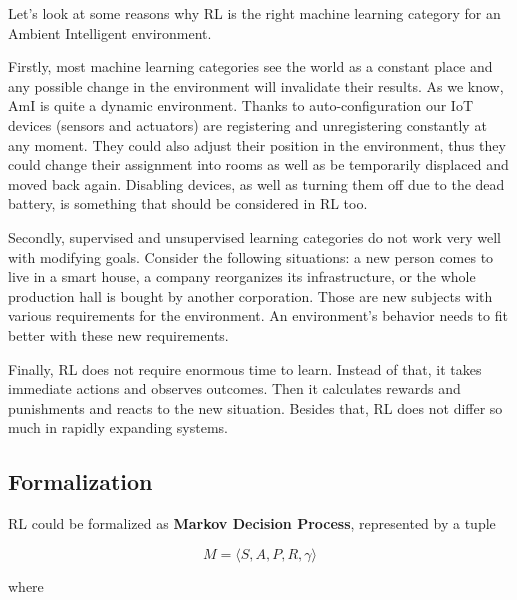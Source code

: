 \documentclass[fleqn,10pt]{olplainarticle}
\begin{document}
Let’s look at some reasons why RL is the right machine learning category for an Ambient Intelligent environment.

\vskip10pt

Firstly, most machine learning categories see the world as a constant place and any possible change in the environment will invalidate their results. As we know, AmI is quite a dynamic environment. Thanks to auto-configuration our IoT devices (sensors and actuators) are registering and unregistering constantly at any moment. They could also adjust their position in the environment, thus they could change their assignment into rooms as well as be temporarily displaced and moved back again. Disabling devices, as well as turning them off due to the dead battery, is something that should be considered in RL too.

\vskip10pt

Secondly, supervised and unsupervised learning categories do not work very well with modifying goals. Consider the following situations: a new person comes to live in a smart house, a company reorganizes its infrastructure, or the whole production hall is bought by another corporation. Those are new subjects with various requirements for the environment. An environment's behavior needs to fit better with these new requirements.

\vskip10pt

Finally, RL does not require enormous time to learn. Instead of that, it takes immediate actions and observes outcomes. Then it calculates rewards and punishments and reacts to the new situation. Besides that, RL does not differ so much in rapidly expanding systems.

\subsection{Formalization}

RL could be formalized as \textbf{Markov Decision Process}, represented by a tuple

$$M = \langle S, A, P, R, \gamma \rangle$$

\noindent where
\end{document}
